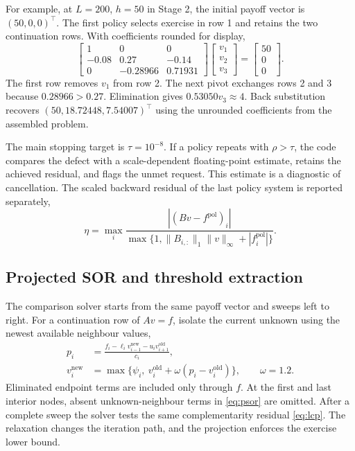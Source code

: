 \documentclass[11pt,a4paper]{article}
\numberwithin{equation}{section}
\begin{document}
For example, at $L=200$, $h=50$ in Stage 2, the initial payoff vector is
$(50,0,0)^\top$. The first policy selects exercise in row 1 and retains
the two continuation rows. With coefficients rounded for display,
\begin{equation}\label{eq:three-node-policy}
 \begin{bmatrix}
 1&0&0\\
 -0.08&0.27&-0.14\\
 0&-0.28966&0.71931
 \end{bmatrix}
 \begin{bmatrix}v_1\\v_2\\v_3\end{bmatrix}
 =\begin{bmatrix}50\\0\\0\end{bmatrix}.
\end{equation}
The first row removes $v_1$ from row 2. The next pivot exchanges rows
2 and 3 because $0.28966>0.27$. Elimination gives
$0.53050v_3\approx4$. Back substitution recovers
$(50,18.72448,7.54007)^\top$ using the unrounded coefficients from the assembled problem.

The main stopping target is $\tau=10^{-8}$. If a policy repeats with
$\rho>\tau$, the code compares the defect with a scale-dependent
floating-point estimate, retains the achieved residual, and flags the
unmet request. This estimate is a diagnostic of cancellation. The scaled
backward residual of the last policy system is reported separately,
\begin{equation}\label{eq:backward-residual}
 \eta=\max_i\frac{|(Bv-f^{\mathrm{pol}})_i|}
 {\max\{1,\|B_{i,:}\|_1\|v\|_\infty+|f^{\mathrm{pol}}_i|\}}.
\end{equation}

\subsection{Projected SOR and threshold extraction}\label{sec:psor}
The comparison solver starts from the same payoff vector and sweeps
left to right. For a continuation row of $Av=f$, isolate the current
unknown using the newest available neighbour values,
\begin{equation}\label{eq:psor}
 \begin{aligned}
 p_i&=\frac{f_i-\ell_i v_{i-1}^{\mathrm{new}}
                     -u_i v_{i+1}^{\mathrm{old}}}{c_i},\\
 v_i^{\mathrm{new}}
    &=\max\{\psi_i,\ v_i^{\mathrm{old}}+
                        \omega(p_i-v_i^{\mathrm{old}})\},
 \qquad \omega=1.2.
 \end{aligned}
\end{equation}
Eliminated endpoint terms are included only through $f$. At the first
and last interior nodes, absent unknown-neighbour terms in
\eqref{eq:psor} are omitted. After a complete sweep the solver tests
the same complementarity residual \eqref{eq:lcp}. The relaxation changes
the iteration path, and the projection enforces the exercise lower bound.
\end{document}
